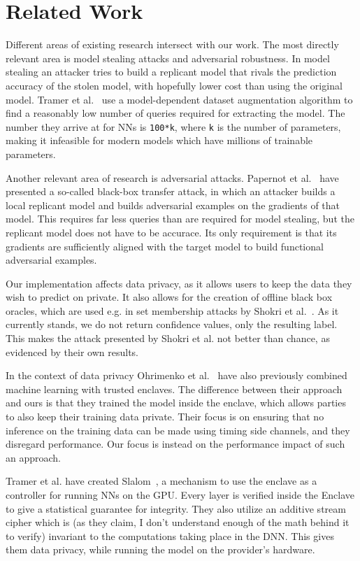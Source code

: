 \documentclass[11pt,twocolumn]{article}
\begin{document}
\section{Related Work}
\label{sec:related}

Different areas of existing research intersect with our work.
The most directly relevant area is model stealing attacks and adversarial robustness.
In model stealing an attacker tries to build a replicant model that rivals the prediction accuracy of the stolen model, with hopefully lower cost than using the original model.
Tramer et al.~\cite{tramer_stealing_2016} use a model-dependent dataset augmentation algorithm to find a reasonably low number of queries required for extracting the model.
The number they arrive at for NNs is \texttt{100*k}, where \texttt{k} is the number of parameters, making it infeasible for modern models which have millions of trainable parameters.

Another relevant area of research is adversarial attacks.
Papernot et al.~\cite{papernot_practical_2017} have presented a so-called black-box transfer attack, in which an attacker builds a local replicant model and builds adversarial examples on the gradients of that model.
This requires far less queries than are required for model stealing, but the replicant model does not have to be accurace.
Its only requirement is that its gradients are sufficiently aligned with the target model to build functional adversarial examples.

Our implementation affects data privacy, as it allows users to keep the data they wish to predict on private.
It also allows for the creation of offline black box oracles, which are used e.g. in set membership attacks by Shokri et al.~\cite{shokri_membership_2017}.
As it currently stands, we do not return confidence values, only the resulting label.
This makes the attack presented by Shokri et al. not better than chance, as evidenced by their own results.

In the context of data privacy Ohrimenko et al.~\cite{ohrimenko_oblivious_2016} have also previously combined machine learning with trusted enclaves.
The difference between their approach and ours is that they trained the model inside the enclave, which allows parties to also keep their training data private.
Their focus is on ensuring that no inference on the training data can be made using timing side channels, and they disregard performance.
Our focus is instead on the performance impact of such an approach.

Tramer et al. have created Slalom~\cite{tramer_slalom_2019}, a mechanism to use the enclave as a controller for running NNs on the GPU.
Every layer is verified inside the Enclave to give a statistical guarantee for integrity.
They also utilize an additive stream cipher which is (as they claim, I don't understand enough of the math behind it to verify) invariant to the computations taking place in the DNN.
This gives them data privacy, while running the model on the provider's hardware.
\end{document}
